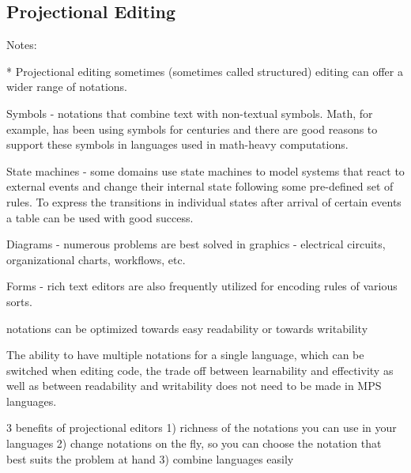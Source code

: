 \subsection{Projectional Editing}\label{chapter:projectional_editing}

Notes:

* Projectional editing sometimes (sometimes called structured) editing can offer a wider range of notations.

Symbols - notations that combine text with non-textual symbols. Math, for example, has been using symbols for centuries and there are good reasons to support these symbols in languages used in math-heavy computations.

State machines - some domains use state machines to model systems that react to external events and change their internal state following some pre-defined set of rules. To express the transitions in individual states after arrival of certain events a table can be used with good success.

Diagrams - numerous problems are best solved in graphics - electrical circuits, organizational charts, workflows, etc.

Forms - rich text editors are also frequently utilized for encoding rules of various sorts.

 notations can be optimized towards easy readability or towards writability

 The ability to have multiple notations for a single language, which can be switched when editing code, the trade off between learnability and effectivity as well as between readability and writability does not need to be made in MPS languages.

 3 benefits of projectional editors
 1) richness of the notations you can use in your languages
 2) change notations on the fly, so you can choose the notation that best suits the problem at hand
 3) combine languages easily
 